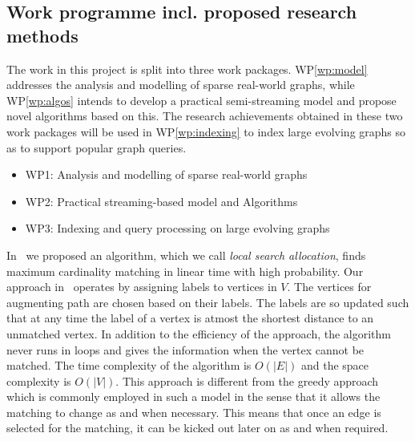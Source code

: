 \subsection{Work programme incl. proposed research methods}

The work in this project is split into three work packages. WP\ref{wp:model}   addresses the analysis and modelling of sparse real-world graphs, while WP\ref{wp:algos} intends to develop a practical semi-streaming model and propose novel algorithms based on this. The research achievements obtained in these two work packages will be used in WP\ref{wp:indexing} to index large evolving graphs so as to support popular graph queries.

 
\begin{itemize}
\item WP1: Analysis and modelling of sparse real-world graphs
\item WP2: Practical streaming-based model and Algorithms
\item WP3: Indexing and query processing on large evolving graphs
\end{itemize}


\label{wp:model}


\label{wp:algos}

In~\cite{ballsbins} we proposed an algorithm, which we call \emph{local search allocation}, finds maximum cardinality matching in linear time with high probability. Our approach in~\cite{ballsbins} operates by assigning labels to vertices in $V$. The vertices for augmenting path are chosen based on their labels. The labels are so updated such that at any time the label of a vertex is atmost the shortest distance to an unmatched vertex. In addition to the efficiency of the approach, the algorithm never runs in loops and gives the information when the vertex cannot be matched. The time complexity of the algorithm is $O(|E|)$ and the space complexity is $O(|V|)$. This approach is different from the greedy approach which is commonly employed in such a model in the sense that it allows the matching to change as and when necessary. This means that once an edge is selected for the matching, it can be kicked out later on as and when required.

